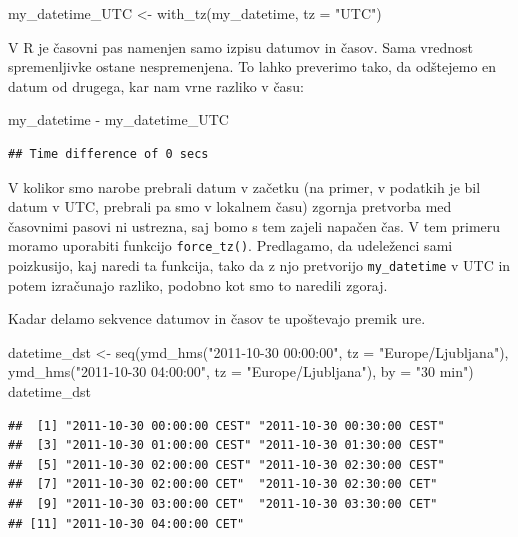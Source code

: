 \documentclass[
]{book}
\newenvironment{Shaded}{\begin{snugshade}}{\end{snugshade}}
\newcommand{\AttributeTok}[1]{\textcolor[rgb]{0.77,0.63,0.00}{#1}}
\newcommand{\FunctionTok}[1]{\textcolor[rgb]{0.00,0.00,0.00}{#1}}
\newcommand{\NormalTok}[1]{#1}
\newcommand{\OtherTok}[1]{\textcolor[rgb]{0.56,0.35,0.01}{#1}}
\newcommand{\SpecialCharTok}[1]{\textcolor[rgb]{0.00,0.00,0.00}{#1}}
\newcommand{\StringTok}[1]{\textcolor[rgb]{0.31,0.60,0.02}{#1}}
\begin{document}
\begin{Shaded}
\begin{Highlighting}[]
\NormalTok{my\_datetime\_UTC }\OtherTok{\textless{}{-}} \FunctionTok{with\_tz}\NormalTok{(my\_datetime, }\AttributeTok{tz =} \StringTok{"UTC"}\NormalTok{)}
\end{Highlighting}
\end{Shaded}

V R je časovni pas namenjen samo izpisu datumov in časov. Sama vrednost spremenljivke ostane nespremenjena. To lahko preverimo tako, da odštejemo en datum od drugega, kar nam vrne razliko v času:

\begin{Shaded}
\begin{Highlighting}[]
\NormalTok{my\_datetime }\SpecialCharTok{{-}}\NormalTok{ my\_datetime\_UTC}
\end{Highlighting}
\end{Shaded}

\begin{verbatim}
## Time difference of 0 secs
\end{verbatim}

V kolikor smo narobe prebrali datum v začetku (na primer, v podatkih je bil datum v UTC, prebrali pa smo v lokalnem času) zgornja pretvorba med časovnimi pasovi ni ustrezna, saj bomo s tem zajeli napačen čas. V tem primeru moramo uporabiti funkcijo \texttt{force\_tz()}. Predlagamo, da udeleženci sami poizkusijo, kaj naredi ta funkcija, tako da z njo pretvorijo \texttt{my\_datetime} v UTC in potem izračunajo razliko, podobno kot smo to naredili zgoraj.

Kadar delamo sekvence datumov in časov te upoštevajo premik ure.

\begin{Shaded}
\begin{Highlighting}[]
\NormalTok{datetime\_dst }\OtherTok{\textless{}{-}} \FunctionTok{seq}\NormalTok{(}\FunctionTok{ymd\_hms}\NormalTok{(}\StringTok{"2011{-}10{-}30 00:00:00"}\NormalTok{, }\AttributeTok{tz =} \StringTok{"Europe/Ljubljana"}\NormalTok{), }
                    \FunctionTok{ymd\_hms}\NormalTok{(}\StringTok{"2011{-}10{-}30 04:00:00"}\NormalTok{, }\AttributeTok{tz =} \StringTok{"Europe/Ljubljana"}\NormalTok{), }
                    \AttributeTok{by =} \StringTok{"30 min"}\NormalTok{)}
\NormalTok{datetime\_dst}
\end{Highlighting}
\end{Shaded}

\begin{verbatim}
##  [1] "2011-10-30 00:00:00 CEST" "2011-10-30 00:30:00 CEST"
##  [3] "2011-10-30 01:00:00 CEST" "2011-10-30 01:30:00 CEST"
##  [5] "2011-10-30 02:00:00 CEST" "2011-10-30 02:30:00 CEST"
##  [7] "2011-10-30 02:00:00 CET"  "2011-10-30 02:30:00 CET" 
##  [9] "2011-10-30 03:00:00 CET"  "2011-10-30 03:30:00 CET" 
## [11] "2011-10-30 04:00:00 CET"
\end{verbatim}
\end{document}
